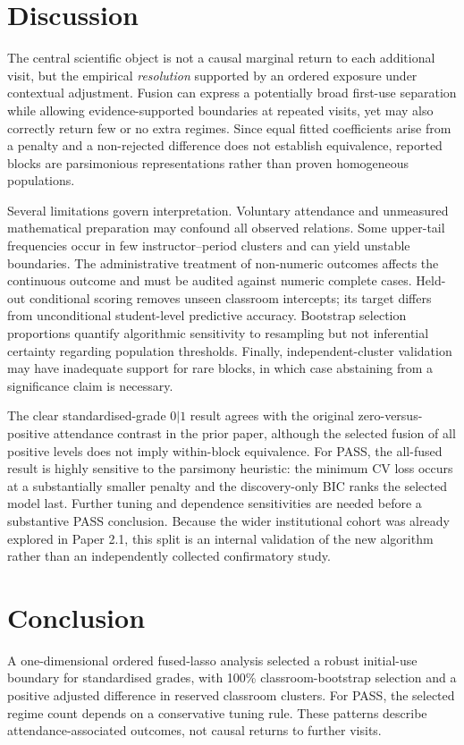 \documentclass[11pt]{article}
\begin{document}


\section{Discussion}
The central scientific object is not a causal marginal return to each additional visit, but the empirical \emph{resolution} supported by an ordered exposure under contextual adjustment. Fusion can express a potentially broad first-use separation while allowing evidence-supported boundaries at repeated visits, yet may also correctly return few or no extra regimes. Since equal fitted coefficients arise from a penalty and a non-rejected difference does not establish equivalence, reported blocks are parsimonious representations rather than proven homogeneous populations.

Several limitations govern interpretation. Voluntary attendance and unmeasured mathematical preparation may confound all observed relations. Some upper-tail frequencies occur in few instructor--period clusters and can yield unstable boundaries. The administrative treatment of non-numeric outcomes affects the continuous outcome and must be audited against numeric complete cases. Held-out conditional scoring removes unseen classroom intercepts; its target differs from unconditional student-level predictive accuracy. Bootstrap selection proportions quantify algorithmic sensitivity to resampling but not inferential certainty regarding population thresholds. Finally, independent-cluster validation may have inadequate support for rare blocks, in which case abstaining from a significance claim is necessary.

The clear standardised-grade $0|1$ result agrees with the original zero-versus-positive attendance contrast in the prior paper, although the selected fusion of all positive levels does not imply within-block equivalence. For PASS, the all-fused result is highly sensitive to the parsimony heuristic: the minimum CV loss occurs at a substantially smaller penalty and the discovery-only BIC ranks the selected model last. Further tuning and dependence sensitivities are needed before a substantive PASS conclusion. Because the wider institutional cohort was already explored in Paper 2.1, this split is an internal validation of the new algorithm rather than an independently collected confirmatory study.

\section{Conclusion}
A one-dimensional ordered fused-lasso analysis selected a robust initial-use boundary for standardised grades, with 100\% classroom-bootstrap selection and a positive adjusted difference in reserved classroom clusters. For PASS, the selected regime count depends on a conservative tuning rule. These patterns describe attendance-associated outcomes, not causal returns to further visits.
\end{document}
